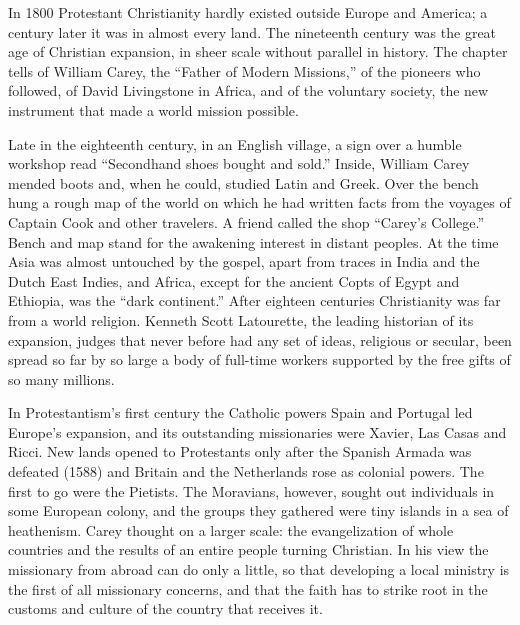 
\begin{inbrief}
In 1800 Protestant Christianity hardly existed outside Europe and America; a century later it was in
almost every land. The nineteenth century was the great age of Christian expansion, in sheer scale
without parallel in history. The chapter tells of William Carey, the ``Father of Modern Missions,''
of the pioneers who followed, of David Livingstone in Africa, and of the voluntary society, the new
instrument that made a world mission possible.
\end{inbrief}

Late in the eighteenth century, in an English village, a sign over a humble workshop read
``Secondhand shoes bought and sold.'' Inside, William Carey mended boots and, when he could, studied
Latin and Greek. Over the bench hung a rough map of the world on which he had written facts from the
voyages of Captain Cook and other travelers. A friend called the shop ``Carey's College.'' Bench and
map stand for the awakening interest in distant peoples. At the time Asia was almost untouched by the
gospel, apart from traces in India and the Dutch East Indies, and Africa, except for the ancient
Copts of Egypt and Ethiopia, was the ``dark continent.'' After eighteen centuries Christianity was far
from a world religion. Kenneth Scott Latourette, the leading historian of its expansion, judges that
never before had any set of ideas, religious or secular, been spread so far by so large a body of full-time workers supported by the free gifts of so many millions.

In Protestantism's first century the Catholic powers Spain and Portugal led Europe's expansion, and
its outstanding missionaries were Xavier, Las Casas and Ricci. New lands opened to Protestants only
after the Spanish Armada was defeated (1588) and Britain and the Netherlands rose as colonial powers. The first to go were the Pietists. The Moravians, however, sought out individuals in some
European colony, and the groups they gathered were tiny islands in a sea of heathenism. Carey thought
on a larger scale: the evangelization of whole countries and the results of an entire people turning Christian. In his view the missionary from abroad can do only a little, so that
developing a local ministry is the first of all missionary concerns, and that the faith has to strike root in the customs and culture of the country that receives it.

